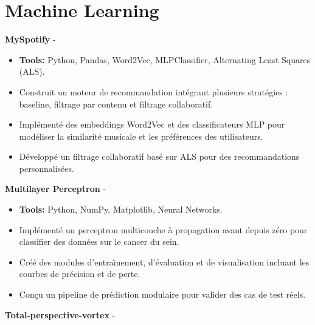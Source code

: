 \documentclass[a4paper,11pt]{article}%
\begin{document}
\section*{Machine Learning}%
%
\noindent \textbf{MySpotify} - \href{https://github.com/sboof911/MySpotify}{{}}%
\begin{itemize}[leftmargin=2em,parsep=0pt,topsep=1em]%
\item[] \textbf{Tools:} Python, Pandas, Word2Vec, MLPClassifier, Alternating Least Squares (ALS).%
\item Construit un moteur de recommandation int\'egrant plusieurs strat\'egies : baseline, filtrage par contenu et filtrage collaboratif.%
\item Impl\'ement\'e des embeddings Word2Vec et des classificateurs MLP pour mod\'eliser la similarit\'e musicale et les pr\'ef\'erences des utilisateurs.%
\item D\'evelopp\'e un filtrage collaboratif bas\'e sur ALS pour des recommandations personnalis\'ees.%
\end{itemize}%
%
\noindent \textbf{Multilayer Perceptron} - \href{https://github.com/sboof911/Multilayer-Perceptron}{{}}%
\begin{itemize}[leftmargin=2em,parsep=0pt,topsep=1em]%
\item[] \textbf{Tools:} Python, NumPy, Matplotlib, Neural Networks.%
\item Impl\'ement\'e un perceptron multicouche \`a propagation avant depuis z\'ero pour classifier des donn\'ees sur le cancer du sein.%
\item Cr\'e\'e des modules d'entra{\^\i}nement, d'\'evaluation et de visualisation incluant les courbes de pr\'ecision et de perte.%
\item Con\c{c}u un pipeline de pr\'ediction modulaire pour valider des cas de test r\'eels.%
\end{itemize}%
%
\noindent \textbf{Total-perspective-vortex} - \href{https://github.com/sboof911/total-perspectivevortex}{{}}%
\end{document}
